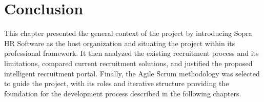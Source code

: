 \section*{Conclusion}

This chapter presented the general context of the project by introducing Sopra HR Software as the host organization and situating the project within its professional framework. It then analyzed the existing recruitment process and its limitations, compared current recruitment solutions, and justified the proposed intelligent recruitment portal. Finally, the Agile Scrum methodology was selected to guide the project, with its roles and iterative structure providing the foundation for the development process described in the following chapters.
